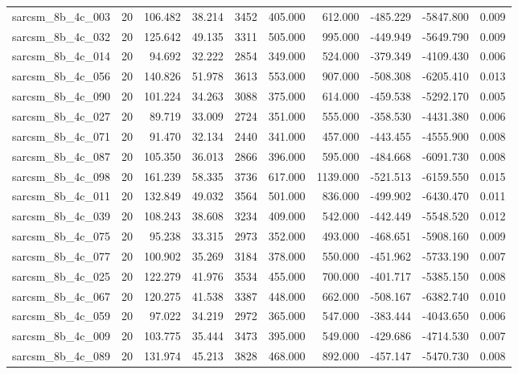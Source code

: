 \begin{tabular}{lrrrrrrrrr}
sarcsm\_8b\_4c\_003 & 20 & 106.482 & 38.214 & 3452 & 405.000 & 612.000 & -485.229 & -5847.800 & 0.009 \\
sarcsm\_8b\_4c\_032 & 20 & 125.642 & 49.135 & 3311 & 505.000 & 995.000 & -449.949 & -5649.790 & 0.009 \\
sarcsm\_8b\_4c\_014 & 20 & 94.692 & 32.222 & 2854 & 349.000 & 524.000 & -379.349 & -4109.430 & 0.006 \\
sarcsm\_8b\_4c\_056 & 20 & 140.826 & 51.978 & 3613 & 553.000 & 907.000 & -508.308 & -6205.410 & 0.013 \\
sarcsm\_8b\_4c\_090 & 20 & 101.224 & 34.263 & 3088 & 375.000 & 614.000 & -459.538 & -5292.170 & 0.005 \\
sarcsm\_8b\_4c\_027 & 20 & 89.719 & 33.009 & 2724 & 351.000 & 555.000 & -358.530 & -4431.380 & 0.006 \\
sarcsm\_8b\_4c\_071 & 20 & 91.470 & 32.134 & 2440 & 341.000 & 457.000 & -443.455 & -4555.900 & 0.008 \\
sarcsm\_8b\_4c\_087 & 20 & 105.350 & 36.013 & 2866 & 396.000 & 595.000 & -484.668 & -6091.730 & 0.008 \\
sarcsm\_8b\_4c\_098 & 20 & 161.239 & 58.335 & 3736 & 617.000 & 1139.000 & -521.513 & -6159.550 & 0.015 \\
sarcsm\_8b\_4c\_011 & 20 & 132.849 & 49.032 & 3564 & 501.000 & 836.000 & -499.902 & -6430.470 & 0.011 \\
sarcsm\_8b\_4c\_039 & 20 & 108.243 & 38.608 & 3234 & 409.000 & 542.000 & -442.449 & -5548.520 & 0.012 \\
sarcsm\_8b\_4c\_075 & 20 & 95.238 & 33.315 & 2973 & 352.000 & 493.000 & -468.651 & -5908.160 & 0.009 \\
sarcsm\_8b\_4c\_077 & 20 & 100.902 & 35.269 & 3184 & 378.000 & 550.000 & -451.962 & -5733.190 & 0.007 \\
sarcsm\_8b\_4c\_025 & 20 & 122.279 & 41.976 & 3534 & 455.000 & 700.000 & -401.717 & -5385.150 & 0.008 \\
sarcsm\_8b\_4c\_067 & 20 & 120.275 & 41.538 & 3387 & 448.000 & 662.000 & -508.167 & -6382.740 & 0.010 \\
sarcsm\_8b\_4c\_059 & 20 & 97.022 & 34.219 & 2972 & 365.000 & 547.000 & -383.444 & -4043.650 & 0.006 \\
sarcsm\_8b\_4c\_009 & 20 & 103.775 & 35.444 & 3473 & 395.000 & 549.000 & -429.686 & -4714.530 & 0.007 \\
sarcsm\_8b\_4c\_089 & 20 & 131.974 & 45.213 & 3828 & 468.000 & 892.000 & -457.147 & -5470.730 & 0.008 \\

\end{tabular}
